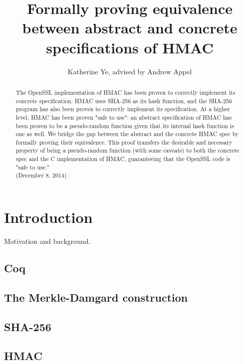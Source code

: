\documentclass[twocolumn,showpacs,%
  nofootinbib,aps,superscriptaddress,%
  eqsecnum,prd,notitlepage,showkeys,10pt]{revtex4-1}
\begin{document}
\title{Formally proving equivalence between abstract and concrete specifications of HMAC}
\author{Katherine Ye, advised by Andrew Appel}

\begin{abstract}
The OpenSSL implementation of HMAC has been proven to correctly implement its concrete specification. HMAC uses SHA-256 as its hash function, and the SHA-256 program has also been proven to correctly implement its specification. At a higher level, HMAC has been proven "safe to use": an abstract specification of HMAC has been proven to be a pseudo-random function given that its internal hash function is one as well. We bridge the gap between the abstract and the concrete HMAC spec by formally proving their equivalence. This proof transfers the desirable and necessary property of being a pseudo-random function (with some caveats) to both the concrete spec and the C implementation of HMAC, guaranteeing that the OpenSSL code is "safe to use."
\\
(December 8, 2014)

\end{abstract}

\maketitle

\section{Introduction}

Motivation and background.

\subsection{Coq}

\subsection{The Merkle-Damgard construction}

\subsection{SHA-256}

\subsection{HMAC}
\end{document}
